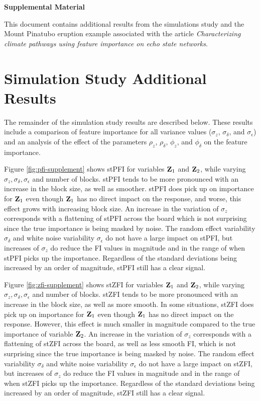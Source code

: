 \documentclass[AMS,STIX2COL]{WileyNJD-v2}
\begin{document}
\begin{center}
{\Large \textbf{Supplemental Material}}
\end{center}

This document contains additional results from the simulations study and the Mount Pinatubo eruption example associated with the article \emph{Characterizing climate pathways using feature importance on echo state networks}.

\section{Simulation Study Additional Results}

The remainder of the simulation study results are described below. These results include a comparison of feature importance for all variance values ($\sigma_z$, $\sigma_\delta$, and $\sigma_\epsilon$) and an analysis of the effect of the parameters $\rho_z$, $\rho_\delta$, $\phi_z$, and $\phi_\delta$ on the feature importance.

Figure \ref{fig:pfi-supplement} shows stPFI for variables ${\bf Z}_1$ and ${\bf Z}_2$, while varying $\sigma_z,\sigma_{\delta},\sigma_{\epsilon}$ and number of blocks. stPFI tends to be more pronounced with an increase in the block size, as well as smoother. stPFI does pick up on importance for ${\bf Z}_1$ even though ${\bf Z}_1$ has no direct impact on the response, and worse, this effect grows with increasing block size. An increase in the variation of $\sigma_z$ corresponds with a flattening of stPFI across the board which is not surprising since the true importance is being masked by noise. The random effect variability $\sigma_{\delta}$ and white noise variability $\sigma_{\epsilon}$ do not have a large impact on stPFI, but  increases of $\sigma_z$ do reduce the FI values in magnitude and in the range of when stPFI picks up the importance.  Regardless of the standard deviations being increased by an order of magnitude, stPFI still has a clear signal.

Figure \ref{fig:zfi-supplement} shows stZFI for variables ${\bf Z}_1$ and ${\bf Z}_2$, while varying $\sigma_z,\sigma_{\delta},\sigma_{\epsilon}$ and number of blocks. stZFI tends to be more pronounced with an increase in the block size, as well as more smooth. In some situations, stZFI does pick up on importance for ${\bf Z}_1$ even though ${\bf Z}_1$ has no direct impact on the response. However, this effect is much smaller in magnitude compared to the true importance of variable ${\bf Z}_2$. An increase in the variation of $\sigma_z$ corresponds with a flattening of stZFI across the board, as well as less smooth FI, which is not surprising since the true importance is being masked by noise. The random effect variability $\sigma_{\delta}$ and white noise variability $\sigma_{\epsilon}$ do not have a large impact on stZFI, but  increases of $\sigma_z$ do reduce the FI values in magnitude and in the range of when stZFI picks up the importance. Regardless of the standard deviations being increased by an order of magnitude, stZFI still has a clear signal.
\end{document}
